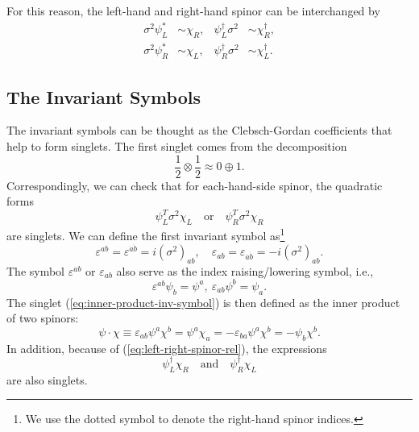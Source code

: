 For this reason, the left-hand and right-hand spinor can be interchanged by
\begin{equation}
\begin{aligned}
	\sigma^2 \psi_L^* &\sim \chi_R, & \psi_L^\dagger \sigma^2 &\sim \chi^\dagger_R, \\
	\sigma^2 \psi_R^* &\sim \chi_L, & \psi^\dagger_R \sigma^2 &\sim \chi^\dagger_L.
	\label{eq:left-right-spinor-rel}
\end{aligned}
\end{equation}



\subsection{The Invariant Symbols}
The invariant symbols can be thought as the Clebsch-Gordan coefficients that help to form singlets.
The first singlet comes from the decomposition
\begin{equation*}
	\frac{1}{2}\otimes \frac{1}{2} \approx 0 \oplus 1.
\end{equation*}
Correspondingly, we can check that for each-hand-side spinor, the quadratic forms
\begin{equation}
	\psi_L^T\sigma^2\chi_L \quad \text{or} \quad 
	\psi_R^T\sigma^2\chi_R
	\label{eq:inner-product-inv-symbol}
\end{equation}
are singlets.
We can define the first invariant symbol as\footnote{We use the dotted symbol to denote the right-hand spinor indices.}
\begin{equation}
	\varepsilon^{ab} = \varepsilon^{\dot a \dot b} = i(\sigma^2)_{ab}, \quad
	\varepsilon_{ab} = \varepsilon_{\dot a \dot b} = -i(\sigma^2)_{ab}.
\end{equation}
The symbol $\varepsilon^{ab}$ or $\varepsilon_{ab}$ also serve as the index raising/lowering symbol, i.e.,
\begin{equation}
	\varepsilon^{ab}\psi_b = \psi^a,\ 
	\varepsilon_{ab}\psi^b = \psi_a.
\end{equation}
The singlet (\ref{eq:inner-product-inv-symbol}) is then defined as the inner product of two spinors:
\begin{equation}
	\psi\cdot\chi 
	\equiv \varepsilon_{ab}\psi^a\chi^b
	= \psi^a\chi_{a}
	= -\varepsilon_{ba}\psi^a\chi^b
	= -\psi_b\chi^b.
\end{equation}
In addition, because of (\ref{eq:left-right-spinor-rel}), the expressions
\begin{equation*}
	\psi_L^\dagger \chi_R \quad \text{and} \quad \psi_R^\dagger \chi_L
\end{equation*}
are also singlets.

